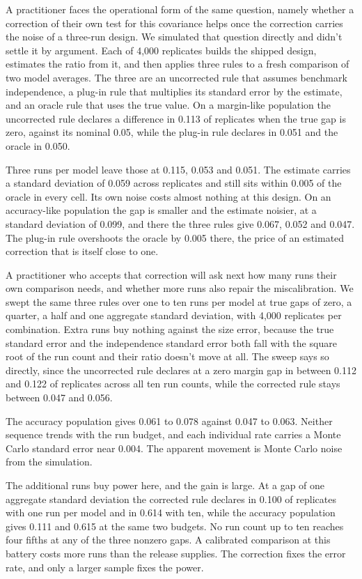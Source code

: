A practitioner faces the operational form of the same question, namely whether a correction of their own test for this covariance helps once the correction carries the noise of a three-run design. We simulated that question directly and didn't settle it by argument. Each of 4,000 replicates builds the shipped design, estimates the ratio from it, and then applies three rules to a fresh comparison of two model averages. The three are an uncorrected rule that assumes benchmark independence, a plug-in rule that multiplies its standard error by the estimate, and an oracle rule that uses the true value. On a margin-like population the uncorrected rule declares a difference in 0.113 of replicates when the true gap is zero, against its nominal 0.05, while the plug-in rule declares in 0.051 and the oracle in 0.050.

Three runs per model leave those at 0.115, 0.053 and 0.051. The estimate carries a standard deviation of 0.059 across replicates and still sits within 0.005 of the oracle in every cell. Its own noise costs almost nothing at this design. On an accuracy-like population the gap is smaller and the estimate noisier, at a standard deviation of 0.099, and there the three rules give 0.067, 0.052 and 0.047. The plug-in rule overshoots the oracle by 0.005 there, the price of an estimated correction that is itself close to one.

A practitioner who accepts that correction will ask next how many runs their own comparison needs, and whether more runs also repair the miscalibration. We swept the same three rules over one to ten runs per model at true gaps of zero, a quarter, a half and one aggregate standard deviation, with 4,000 replicates per combination. Extra runs buy nothing against the size error, because the true standard error and the independence standard error both fall with the square root of the run count and their ratio doesn't move at all. The sweep says so directly, since the uncorrected rule declares at a zero margin gap in between 0.112 and 0.122 of replicates across all ten run counts, while the corrected rule stays between 0.047 and 0.056.

The accuracy population gives 0.061 to 0.078 against 0.047 to 0.063. Neither sequence trends with the run budget, and each individual rate carries a Monte Carlo standard error near 0.004. The apparent movement is Monte Carlo noise from the simulation.

The additional runs buy power here, and the gain is large. At a gap of one aggregate standard deviation the corrected rule declares in 0.100 of replicates with one run per model and in 0.614 with ten, while the accuracy population gives 0.111 and 0.615 at the same two budgets. No run count up to ten reaches four fifths at any of the three nonzero gaps. A calibrated comparison at this battery costs more runs than the release supplies. The correction fixes the error rate, and only a larger sample fixes the power.


